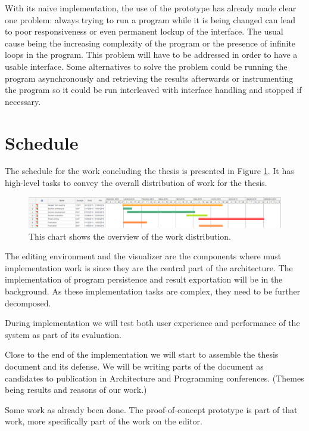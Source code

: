 \documentclass{./llncs2e/llncs}
\begin{document}
	With its naive implementation, the use of the prototype has already made clear one problem: always trying to run a program while it is being changed can lead to poor responsiveness or even permanent lockup of the interface.
	The usual cause being the increasing complexity of the program or the presence of infinite loops in the program. 
	This problem will have to be addressed in order to have a usable interface. 
	Some alternatives to solve the problem could be running the program asynchronously and retrieving the results afterwards or instrumenting the program so it could be run interleaved with interface handling and stopped if necessary.

\section{Schedule}
	The schedule for the work concluding the thesis is presented in Figure \ref{fig:schedule}.
	It has high-level tasks to convey the overall distribution of work for the thesis.
	
	\begin{figure}
		\centering
		\includegraphics[width=1.0\textwidth]{img/schedule}
		\caption{This chart shows the overview of the work distribution.}
		\label{fig:schedule}
	\end{figure}
	
	The editing environment and the visualizer are the components where must implementation work is since they are the central part of the architecture.
	The implementation of program persistence and result exportation will be in the background.
	As these implementation tasks are complex, they need to be further decomposed.
	
	During implementation we will test both user experience and performance of the system as part of its evaluation.
	
	Close to the end of the implementation we will start to assemble the thesis document and its defense.
	We will be writing parts of the document as candidates to publication in Architecture and Programming conferences.
	(Themes being results and reasons of our work.)
	
	Some work as already been done.
	The proof-of-concept prototype is part of that work, more specifically part of the work on the editor.
		
\end{document}
